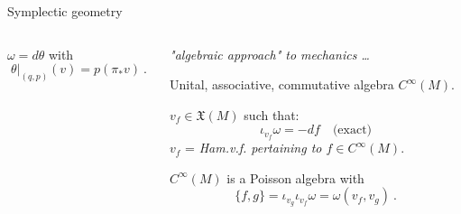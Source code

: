 \documentclass[beamer,10pt]{standalone}
\begin{document}
\begin{frame}{Symplectic geometry}
\begin{columns}[T]
\begin{column}{.50\linewidth}
\begin{columns}
\begin{column}{.50\linewidth}
\begin{center}
				\end{center}
			\end{column}	
		\end{columns}
		\begin{defblock}
				
		\end{defblock}
		\begin{exblock}[$M = T^\ast Q$ is symplectic]
			$\omega = d \theta $ with
			$$ \left.\theta\right\vert_{(q,p)} (v) = p (\pi_\ast v) ~.$$
		\end{exblock}
	\end{column}
	\vrule{}
	\pause
	\begin{column}{.50\linewidth}
		\centering
		\textit{ "algebraic approach" to mechanics \dots}
		\vspace{1em}	
		\begin{defblock}
			Unital, associative, commutative algebra $C^\infty(M)$.
		\end{defblock}
		\vspace{1em}
		\pause
		\begin{defblock}
			$v_f \in \mathfrak{X}(M)$ such that:
			$$\iota_{v_f} \omega = -df \quad \text{(exact)}$$ %
			\small$v_f$ = \emph{Ham.v.f. pertaining to $f\in C^\infty(M)$}.
		\end{defblock}
		\begin{defblock}
			$C^\infty(M)$ is a Poisson algebra with
			$$\{f,g\} = \iota_{v_g} \iota_{v_f} \omega = \omega(v_f,v_g) ~.$$
		\end{defblock}
	\end{column}
\end{columns}
\end{frame}
\end{document}
